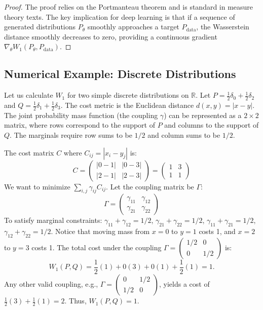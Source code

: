 \begin{proof}
The proof relies on the Portmanteau theorem and is standard in measure theory texts. The key implication for deep learning is that if a sequence of generated distributions $P_\theta$ smoothly approaches a target $P_{\text{data}}$, the Wasserstein distance smoothly decreases to zero, providing a continuous gradient $\nabla_\theta W_1(P_\theta, P_{\text{data}})$.
\end{proof}

\subsection{Numerical Example: Discrete Distributions}
Let us calculate $W_1$ for two simple discrete distributions on $\mathbb{R}$. 
Let $P = \frac{1}{2}\delta_0 + \frac{1}{2}\delta_2$ and $Q = \frac{1}{2}\delta_1 + \frac{1}{2}\delta_3$.
The cost metric is the Euclidean distance $d(x, y) = |x - y|$. 
The joint probability mass function (the coupling $\gamma$) can be represented as a $2 \times 2$ matrix, where rows correspond to the support of $P$ and columns to the support of $Q$. The marginals require row sums to be $1/2$ and column sums to be $1/2$.

The cost matrix $C$ where $C_{ij} = |x_i - y_j|$ is:
\[
C = \begin{pmatrix}
|0-1| & |0-3| \\
|2-1| & |2-3|
\end{pmatrix}
= \begin{pmatrix}
1 & 3 \\
1 & 1
\end{pmatrix}
\]
We want to minimize $\sum_{i,j} \gamma_{ij} C_{ij}$. Let the coupling matrix be $\Gamma$:
\[
\Gamma = \begin{pmatrix}
\gamma_{11} & \gamma_{12} \\
\gamma_{21} & \gamma_{22}
\end{pmatrix}
\]
To satisfy marginal constraints: $\gamma_{11} + \gamma_{12} = 1/2$, $\gamma_{21} + \gamma_{22} = 1/2$, $\gamma_{11} + \gamma_{21} = 1/2$, $\gamma_{12} + \gamma_{22} = 1/2$.
Notice that moving mass from $x=0$ to $y=1$ costs 1, and $x=2$ to $y=3$ costs 1. The total cost under the coupling $\Gamma = \begin{pmatrix} 1/2 & 0 \\ 0 & 1/2 \end{pmatrix}$ is:
\[
W_1(P, Q) = \frac{1}{2}(1) + 0(3) + 0(1) + \frac{1}{2}(1) = 1.
\]
Any other valid coupling, e.g., $\Gamma = \begin{pmatrix} 0 & 1/2 \\ 1/2 & 0 \end{pmatrix}$, yields a cost of $\frac{1}{2}(3) + \frac{1}{2}(1) = 2$. Thus, $W_1(P, Q) = 1$.

